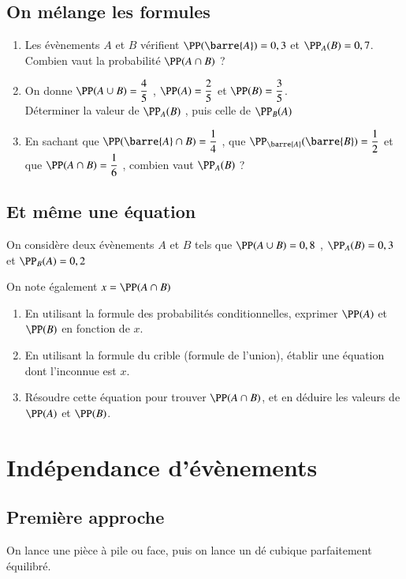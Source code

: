 \documentclass[oneside,12pt]{article}          %
\begin{document}
\subsection{On mélange les formules}
\begin{enumerate} \setlength{\itemsep}{1mm}
	\item Les évènements $A$ et $B$ vérifient $\PP(\barre{A}) = 0,3$ et $\PP_A(B) = 0,7$.  \\	
	Combien vaut la probabilité $\PP(A \cap B)$ ?
	\item On donne $\PP(A \cup B) = \dfrac{4}{5}$ , $\PP(A) = \dfrac{2}{5}$ et $\PP(B) = \dfrac{3}{5}$. \\	
	Déterminer la valeur de $\PP_A(B)$ , puis celle de $\PP_B(A)$
	\item En sachant que $\PP(\barre{A} \cap B) = \dfrac{1}{4}$ , que $\PP_{\barre{A}}(\barre{B}) = \dfrac{1}{2}$ et que $\PP(A \cap B) = \dfrac{1}{6}$ , combien vaut $\PP_A(B)$ ?
\end{enumerate}



\subsection{Et même une équation}
On considère deux évènements $A$ et $B$ tels que $\PP(A \cup B) = 0,8$ , $\PP_A(B) = 0,3$ et $\PP_B(A) = 0,2$

On note également $x = \PP(A \cap B)$
\begin{enumerate}
	\item En utilisant la formule des probabilités conditionnelles, exprimer $\PP(A)$ et $\PP(B)$ en fonction de $x$.
	\item En utilisant la formule du crible (formule de l'union), établir une équation dont l'inconnue est $x$.
	\item Résoudre cette équation pour trouver $\PP(A \cap B)$, et en déduire les valeurs de $\PP(A)$ et $\PP(B)$.
\end{enumerate}



\section{Indépendance d'évènements}

\subsection{Première approche}
On lance une pièce à pile ou face, puis on lance un dé cubique parfaitement équilibré.
\end{document}
